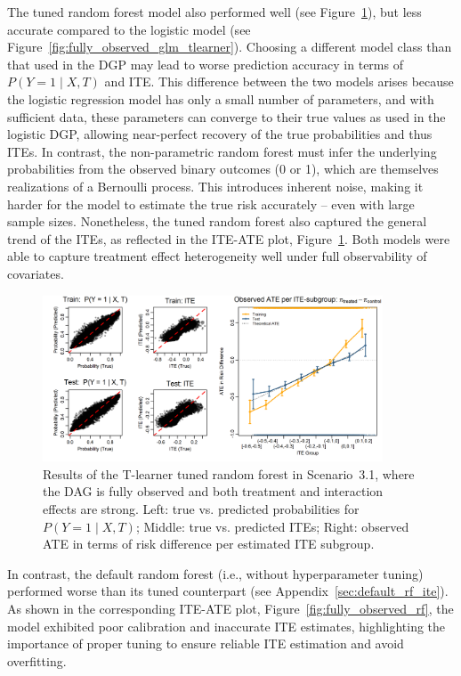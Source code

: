 The tuned random forest model also performed well (see Figure~\ref{fig:fully_tuned_rf_tlearner}), but less accurate compared to the logistic model (see Figure~\ref{fig:fully_observed_glm_tlearner}). Choosing a different model class than that used in the DGP may lead to worse prediction accuracy in terms of $P(Y = 1 \mid X, T)$ and ITE. This difference between the two models arises because the logistic regression model has only a small number of parameters, and with sufficient data, these parameters can converge to their true values as used in the logistic DGP, allowing near-perfect recovery of the true probabilities and thus ITEs. In contrast, the non-parametric random forest must infer the underlying probabilities from the observed binary outcomes (0 or 1), which are themselves realizations of a Bernoulli process. This introduces inherent noise, making it harder for the model to estimate the true risk accurately -- even with large sample sizes. Nonetheless, the tuned random forest also captured the general trend of the ITEs, as reflected in the ITE-ATE plot, Figure~\ref{fig:fully_tuned_rf_tlearner}. Both models were able to capture treatment effect heterogeneity well under full observability of covariates.





\begin{figure}[htbp]
\centering
\includegraphics[width=0.9\textwidth]{img/results_ITE_simulation/fully_observed_tuned_rf_tlearner.png}
\caption{Results of the T-learner tuned random forest in Scenario~3.1, where the DAG is fully observed and both treatment and interaction effects are strong. Left: true vs. predicted probabilities for $P(Y = 1 \mid X, T)$; Middle: true vs. predicted ITEs; Right: observed ATE in terms of risk difference per estimated ITE subgroup.}
\label{fig:fully_tuned_rf_tlearner}
\end{figure}


In contrast, the default random forest (i.e., without hyperparameter tuning) performed worse than its tuned counterpart (see Appendix~\ref{sec:default_rf_ite}). As shown in the corresponding ITE-ATE plot, Figure~\ref{fig:fully_observed_rf}, the model exhibited poor calibration and inaccurate ITE estimates, highlighting the importance of proper tuning to ensure reliable ITE estimation and avoid overfitting.



